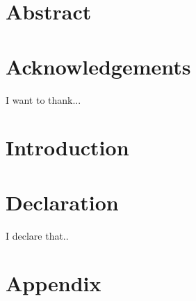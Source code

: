 \documentclass[12pt, twoside]{report}
\begin{document}
\chapter*{Abstract}


\chapter*{Acknowledgements}
I want to thank...

\tableofcontents
\listoffigures
\listoftables
\chapter{Introduction}
\label{chapter01}


\chapter*{Declaration}
I declare that..

\appendix
\chapter{Appendix}	
%

\printbibliography
\end{document}
